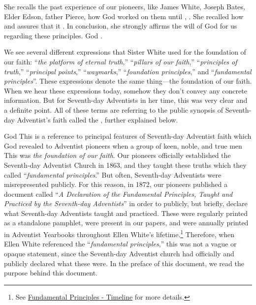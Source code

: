 She recalls the past experience of our pioneers, like James White, Joseph Bates, Elder Edson, father Pierce, how God worked on them until , . She recalled how  and assures that it . In conclusion, she strongly affirms the will of God for us regarding these principles. God . 

We see several different expressions that Sister White used for the foundation of our faith: “\textit{the platform of eternal truth},” “\textit{pillars of our faith},” “\textit{principles of truth},” “\textit{principal points},” “\textit{waymarks},” “\textit{foundation principles},” and “\textit{fundamental principles}”. These expressions denote the same thing—the foundation of our faith. When we hear these expressions today, somehow they don’t convey any concrete information. But for Seventh-day Adventists in her time, this was very clear and a definite point. All of these terms are referring to the public synopsis of Seventh-day Adventist’s faith called the , further explained below.

God  This is a reference to principal features of Seventh-day Adventist faith which God revealed to Adventist pioneers  when a group of keen, noble, and true men  This was \textit{the foundation of our faith}. Our pioneers officially established the Seventh-day Adventist Church in 1863, and they taught these truths which they called “\textit{fundamental principles}.” But often, Seventh-day Adventists were misrepresented publicly. For this reason, in 1872, our pioneers published a document called “\textit{A Declaration of the Fundamental Principles, Taught and Practiced by the Seventh-day Adventists}” in order to publicly, but briefly, declare what  Seventh-day Adventists taught and practiced. These  were regularly printed as a standalone pamphlet, were present in our papers, and were annually printed in Adventist Yearbooks throughout Ellen White's lifetime.\footnote{See \hyperref[appendix:timeline]{Fundamental Principles - Timeline} for more details.} Therefore, when Ellen White referenced the “\textit{fundamental principles},” this was not a vague or opaque statement, since the Seventh-day Adventist church had officially and publicly declared what these  were. In the preface of this document, we read the purpose behind this document.

